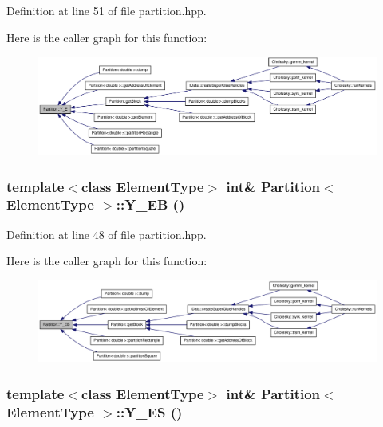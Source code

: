 Definition at line 51 of file partition.hpp.

Here is the caller graph for this function:\nopagebreak
\begin{figure}[H]
\begin{center}
\leavevmode
\includegraphics[width=420pt]{class_partition_a3721344cfda08fbf4f0ee806082d0ac3_icgraph}
\end{center}
\end{figure}
\hypertarget{class_partition_a017cfca75cb8141fb3502d5a90a5e567}{
\subsubsection[{Y\_\-EB}]{\setlength{\rightskip}{0pt plus 5cm}template$<$class ElementType$>$ int\& {\bf Partition}$<$ ElementType $>$::Y\_\-EB ()}}
\label{class_partition_a017cfca75cb8141fb3502d5a90a5e567}


Definition at line 48 of file partition.hpp.

Here is the caller graph for this function:\nopagebreak
\begin{figure}[H]
\begin{center}
\leavevmode
\includegraphics[width=420pt]{class_partition_a017cfca75cb8141fb3502d5a90a5e567_icgraph}
\end{center}
\end{figure}
\hypertarget{class_partition_a618a4ee9a5432087b30e2e6ef4d951ce}{
\subsubsection[{Y\_\-ES}]{\setlength{\rightskip}{0pt plus 5cm}template$<$class ElementType$>$ int\& {\bf Partition}$<$ ElementType $>$::Y\_\-ES ()}}
\label{class_partition_a618a4ee9a5432087b30e2e6ef4d951ce}


